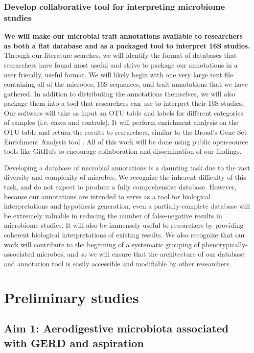 \documentclass[12pt]{article}
\begin{document}
\subsubsection{Develop collaborative tool for interpreting microbiome studies}
\textbf{We will make our microbial trait annotations available to researchers as both
a flat database and as a packaged tool to interpret
16S studies.} Through our literature searches, 
we will identify the format of databases that researchers have found most 
useful and strive to package our annotations in a user friendly, useful format. 
We will likely begin with one very large text file containing all of 
the microbes, 16S sequences, and trait annotations that we have gathered. In addition to distributing the annotations themselves, we will also package them into a tool 
that researchers can use to interpret their 16S 
studies. Our software will take as input an OTU table and labels for different categories
of samples (i.e. cases and controls). 
It will perform enrichment analysis on the OTU table and return the 
results to researchers, similar to the Broad's Gene Set Enrichment Analysis tool \cite{subramanian-gsea-2005}. All of this work will be done using public open-source tools like 
GitHub to encourage collaboration and dissemination of our findings.

Developing a database of microbial annotations is a daunting task due 
to the vast diversity and complexity of microbes. We recognize the 
inherent difficulty of this task, and do not expect to produce a fully 
comprehensive database. However, because our annotations are intended 
to serve as a tool for biological interpretations and hypothesis 
generation, even a partially-complete database will be extremely 
valuable in reducing the number of false-negative results in microbiome 
studies. It will also be immensely useful
to researchers by providing coherent biological interpretations 
of existing results. We also recognize that our work will contribute to the 
beginning of a systematic grouping of phenotypically-associated 
microbes, and so we will ensure that the architecture of our database and annotation tool 
is easily accessible and modifiable by other researchers.


\section{Preliminary studies}

\subsection{Aim 1: Aerodigestive microbiota associated with GERD and aspiration}
\end{document}
